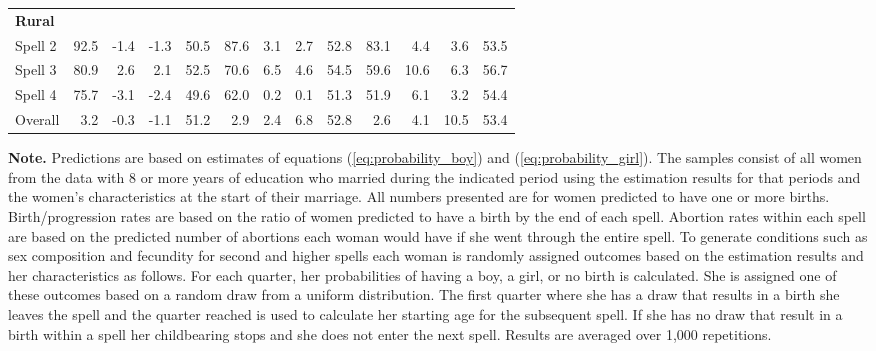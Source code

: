 \documentclass[12pt,letterpaper]{article}
\begin{document}
\begin{table}[htbp]
\begin{center}
\begin{scriptsize}
\begin{threeparttable}
\begin{tabular} {@{} l D{.}{.}{2.1} D{.}{.}{2.1} D{.}{.}{2.1} D{.}{.}{2.1}  D{.}{.}{2.1} D{.}{.}{2.1} D{.}{.}{2.1} D{.}{.}{2.1} D{.}{.}{2.1} D{.}{.}{2.1} D{.}{.}{2.1} D{.}{.}{2.1}  @{}}
\addlinespace 
\bf Rural        &  \\                                                                                  
Spell 2          &       92.5   &  -1.4   &  -1.3   &  50.5   &       87.6   &  3.1    &  2.7  &  52.8   &       83.1   &  4.4    &  3.6   &  53.5      \\
Spell 3          &       80.9   &  2.6    &  2.1    &  52.5   &       70.6   &  6.5    &  4.6  &  54.5   &       59.6   &  10.6   &  6.3   &  56.7      \\
Spell 4          &       75.7   &  -3.1   &  -2.4   &  49.6   &       62.0   &  0.2    &  0.1  &  51.3   &       51.9   &  6.1    &  3.2   &  54.4      \\
Overall &       3.2    &  -0.3   &  -1.1   &  51.2   &       2.9    &  2.4    &  6.8  &  52.8   &       2.6    &  4.1    &  10.5  &  53.4      \\
\bottomrule
\end{tabular}                        
\begin{tablenotes} \tiny
\item \hspace*{-0.5em} \textbf{Note.} Predictions are based on estimates of equations 
(\ref{eq:probability_boy}) and (\ref{eq:probability_girl}).
The samples consist of all women from the data with 8 or more years of education who
married during the indicated period using the estimation results for that periods 
and the women's characteristics at the start of their marriage. 
All numbers presented are for women predicted to have one or more births.
Birth/progression rates are based on the ratio of women predicted to have a birth 
by the end of each spell.
Abortion rates within each spell are based on the predicted number of abortions each
woman would have if she went through the entire spell.
To generate conditions such as sex composition and fecundity for second and higher spells 
each woman is randomly assigned outcomes based on the estimation results and
her characteristics as follows.
For each quarter, her probabilities of having a boy, a girl, or no birth is calculated.
She is assigned one of these outcomes based on a random draw from a uniform distribution.
The first quarter where she has a draw that results in a birth she leaves the spell
and the quarter reached is used to calculate her starting age for the subsequent spell.
If she has no draw that result in a birth within a spell her childbearing stops and
she does not enter the next spell.
Results are averaged over 1,000 repetitions.

\end{tablenotes}
\end{threeparttable}
\end{scriptsize}
\end{center}
\end{table}
\end{document}
